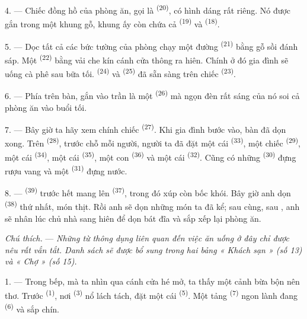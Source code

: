 4. --- Chiếc đồng hồ của phòng ăn, gọi là 
\textsuperscript{(20)}, có hình dáng rất riêng. Nó được gắn trong một khung gỗ, khung ấy
còn chứa cả  \textsuperscript{(19)} và 
\textsuperscript{(18)}.

\VUsaut{4.6mm}
\VUsaut{3.0mm}

5. --- Dọc tất cả các bức tường của phòng chạy một đường 
\textsuperscript{(21)} bằng gỗ sồi đánh sáp. Một 
\textsuperscript{(22)} bằng vải che kín cánh cửa thông ra hiên. Chính ở đó gia đình sẽ
uống cà phê sau bữa tối.  \textsuperscript{(24)} và 
\textsuperscript{(25)} đã sẵn sàng trên chiếc 
\textsuperscript{(23)}.

6. --- Phía trên bàn, gắn vào trần là một  \textsuperscript{(26)} mà
ngọn đèn rất sáng của nó soi cả phòng ăn vào buổi tối.

7. --- Bây giờ ta hãy xem chính chiếc  \textsuperscript{(27)}. Khi gia
đình bước vào, bàn đã dọn xong. Trên  \textsuperscript{(28)},
trước chỗ mỗi người, người ta đã đặt một cái  \textsuperscript{(33)}, một
chiếc  \textsuperscript{(29)}, một cái 
\textsuperscript{(34)}, một cái  \textsuperscript{(35)}, một con
 \textsuperscript{(36)} và một cái  \textsuperscript{(32)}. Cũng
có những  \textsuperscript{(30)} đựng rượu vang và một 
\textsuperscript{(31)} đựng nước.

8. ---  \textsuperscript{(39)} trước hết mang lên  \textsuperscript{(37)}, trong đó xúp còn bốc khói. Bây giờ anh dọn 
\textsuperscript{(38)} thứ nhất, món thịt. Rồi anh sẽ dọn những món ta đã kể; sau cùng,
sau , anh sẽ nhân lúc chủ nhà sang hiên để dọn bát đĩa và sắp
xếp lại phòng ăn.

\textit{Chú thích.} --- \textit{Những từ thông dụng liên quan đến việc ăn uống ở đây chỉ
được nêu rất vắn tắt. Danh sách sẽ được bổ sung trong hai bảng « Khách sạn »
(số 13) và « Chợ » (số 15).}

\VUsaut{4.6mm}
\VUsaut{3.0mm}

1. --- Trong bếp, mà ta nhìn qua cánh cửa hé mở, ta thấy một cảnh bừa bộn nên thơ. Trước
 \textsuperscript{(1)}, nơi  \textsuperscript{(3)} nổ lách
tách, đặt một cái  \textsuperscript{(5)}. Một tảng 
\textsuperscript{(7)} ngon lành đang  \textsuperscript{(6)} và sắp chín.

